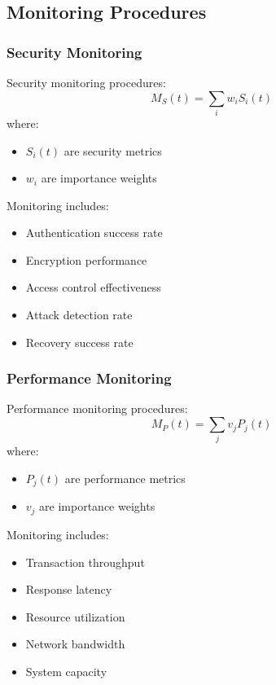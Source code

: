 \documentclass[12pt]{article}
\begin{document}
\subsection{Monitoring Procedures}
\subsubsection{Security Monitoring}
Security monitoring procedures:
\begin{equation}
M_S(t) = \sum_i w_i S_i(t)
\end{equation}
where:
\begin{itemize}
\item $S_i(t)$ are security metrics
\item $w_i$ are importance weights
\end{itemize}
Monitoring includes:
\begin{itemize}
\item Authentication success rate
\item Encryption performance
\item Access control effectiveness
\item Attack detection rate
\item Recovery success rate
\end{itemize}
\subsubsection{Performance Monitoring}
Performance monitoring procedures:
\begin{equation}
M_P(t) = \sum_j v_j P_j(t)
\end{equation}
where:
\begin{itemize}
\item $P_j(t)$ are performance metrics
\item $v_j$ are importance weights
\end{itemize}
Monitoring includes:
\begin{itemize}
\item Transaction throughput
\item Response latency
\item Resource utilization
\item Network bandwidth
\item System capacity
\end{itemize}
\end{document}

